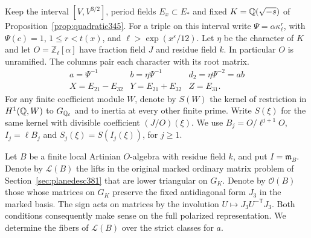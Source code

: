\documentclass[a4paper,11pt]{article}
\theoremstyle{definition}
\theoremstyle{remark}
\newcommand{\ZZ}{\mathbb Z}\newcommand{\ord}{\operatorname{ord}}
\numberwithin{equation}{section}
\begin{document}
Keep the interval \([V,V^{3/2}]\), period fields \(E_x\subset E_*\)
and fixed \(K=\mathbb Q(\sqrt{-s})\) of
Proposition~\ref{prop:quadratic345}. For a triple on this interval
write \(\Psi=\alpha\kappa_\ell^r\), with \(\Psi(c)=1\),
\(1\le r<t(x)\), and \(\ell>\exp(x^\varepsilon/12)\). Let \(\eta\)
be the character of \(K\) and let \(O=\ZZ_\ell[\alpha]\) have
fraction field \(J\) and residue field \(k\). In particular \(O\)
is unramified. The columns pair each character with its root matrix.
\[
\begin{array}{c|c|c}
 a=\Psi^{-1} & b=\eta\Psi^{-1} & d_2=\eta\Psi^{-2}=ab\\
 X=E_{21}-E_{32} & Y=E_{21}+E_{32} & Z=E_{31}.
\end{array}
\]
For any finite coefficient module \(W\), denote by \(S(W)\) the
kernel of restriction in \(H^1(\mathbb Q,W)\) to \(G_{\mathbb Q_\ell}\)
and to inertia at every other finite prime. Write \(S(\xi)\) for
the same kernel with divisible coefficient \((J/O)(\xi)\).
We use \(B_j=O/\ell^{j+1}O\), \(I_j=\ell B_j\) and
\(S_j(\xi)=S(I_j(\xi))\), for \(j\ge1\).

Let \(B\) be a finite local Artinian \(O\)-algebra with residue
field \(k\), and put \(I=\mathfrak m_B\). Denote by
\(\mathcal L(B)\) the lifts in the original marked ordinary
matrix problem of Section~\ref{sec:planedesc381} that are lower
triangular on \(G_K\). Denote by \(\mathcal O(B)\) those whose
matrices on \(G_K\) preserve the fixed antidiagonal form \(J_3\)
in the marked basis. The sign acts on matrices by the involution
\(U\mapsto J_3 U^{-\mathsf T}J_3\). Both conditions consequently
make sense on the full polarized representation. We determine the
fibers of \(\mathcal L(B)\) over the strict classes for \(a\).
\end{document}
